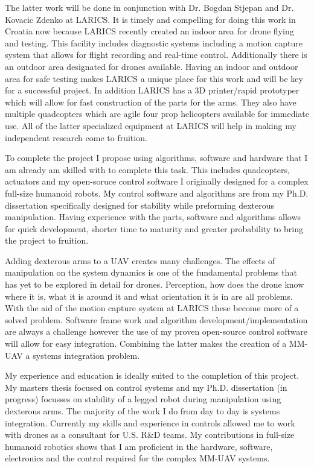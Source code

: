\documentclass[12pt]{article}
\begin{document}
The latter work will be done in conjunction with Dr. Bogdan Stjepan and Dr. Kovacic Zdenko at LARICS.  
It is timely and compelling for doing this work in Croatia now because LARICS recently created an indoor area for drone flying and testing.  
This facility includes diagnostic systems including a motion capture system that allows for flight recording and real-time control.
Additionally there is an outdoor area designated for drones available. 
Having an indoor and outdoor area for safe testing makes LARICS a unique place for this work and will be key for a successful project.
In addition LARICS has a 3D printer/rapid prototyper which will allow for fast construction of the parts for the arms.
They also have multiple quadcopters which are agile four prop helicopters available for immediate use.  
All of the latter specialized equipment at LARICS will help in making my independent research come to fruition.

To complete the project I propose using algorithms, software and hardware that I am already am skilled with to complete this task.
This includes quadcopters, actuators and my open-soruce control software I originally designed for a complex full-size humanoid robots.
My control software and algorithms are from my Ph.D. dissertation specifically designed for stability while preforming dexterous manipulation.  
Having experience with the parts, software and algorithms allows for quick development, shorter time to maturity and greater probability to bring the project to fruition.  

Adding dexterous arms to a UAV creates many challenges.
The effects of manipulation on the system dynamics is one of the fundamental problems that has yet to be explored in detail for drones.
Perception, how does the drone know where it is, what it is around it and what orientation it is in are all problems. 
With the aid of the motion capture system at LARICS these become more of a solved problem.
Software frame work and algorithm development/implementation are always a challenge however the use of my proven open-source control software will allow for easy integration.
Combining the latter makes the creation of a MM-UAV a systems integration problem.  

My experience and education is ideally suited to the completion of this project.  
My masters thesis focused on control systems and my Ph.D. dissertation (in progress) focusses on stability of a legged robot during manipulation using dexterous arms.  
The majority of the work I do from day to day is systems integration.  
Currently my skills and experience in controls allowed me to work with drones as a consultant for U.S. R\&D teams.
My contributions in full-size humanoid robotics shows that I am proficient in the hardware, software, electronics and the control required for the complex MM-UAV systems.
\end{document}
